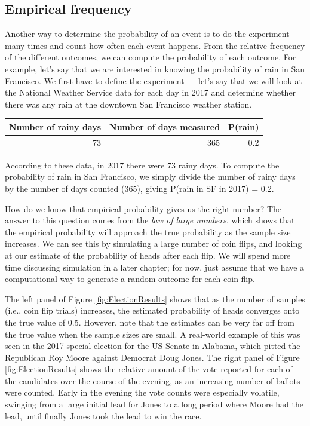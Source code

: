 \documentclass[12pt,]{book}
\theoremstyle{definition}
\theoremstyle{definition}
\theoremstyle{definition}
\theoremstyle{remark}
\begin{document}
\hypertarget{empirical-frequency}{%
\subsection{Empirical frequency}\label{empirical-frequency}}

Another way to determine the probability of an event is to do the experiment many times and count how often each event happens. From the relative frequency of the different outcomes, we can compute the probability of each outcome. For example, let's say that we are interested in knowing the probability of rain in San Francisco. We first have to define the experiment --- let's say that we will look at the National Weather Service data for each day in 2017 and determine whether there was any rain at the downtown San Francisco weather station.

\begin{tabular}{r|r|r}
\hline
Number of rainy days & Number of days measured & P(rain)\\
\hline
73 & 365 & 0.2\\
\hline
\end{tabular}

According to these data, in 2017 there were 73 rainy days. To compute the probability of rain in San Francisco, we simply divide the number of rainy days by the number of days counted (365), giving P(rain in SF in 2017) = 0.2.

How do we know that empirical probability gives us the right number? The answer to this question comes from the \emph{law of large numbers}, which shows that the empirical probability will approach the true probability as the sample size increases. We can see this by simulating a large number of coin flips, and looking at our estimate of the probability of heads after each flip. We will spend more time discussing simulation in a later chapter; for now, just assume that we have a computational way to generate a random outcome for each coin flip.

The left panel of Figure \ref{fig:ElectionResults} shows that as the number of samples (i.e., coin flip trials) increases, the estimated probability of heads converges onto the true value of 0.5. However, note that the estimates can be very far off from the true value when the sample sizes are small. A real-world example of this was seen in the 2017 special election for the US Senate in Alabama, which pitted the Republican Roy Moore against Democrat Doug Jones. The right panel of Figure \ref{fig:ElectionResults} shows the relative amount of the vote reported for each of the candidates over the course of the evening, as an increasing number of ballots were counted. Early in the evening the vote counts were especially volatile, swinging from a large initial lead for Jones to a long period where Moore had the lead, until finally Jones took the lead to win the race.
\end{document}
